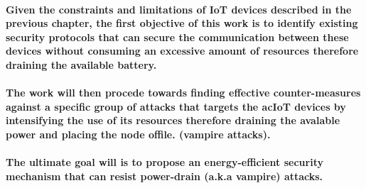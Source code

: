 \paragraph{
Given the constraints and limitations of \ac{IoT} devices described in the previous chapter, the first objective of this work is to identify existing security protocols that can secure the communication between these devices without consuming an excessive amount of resources therefore draining the available battery.
}
\paragraph{
The work will then procede towards finding effective counter-measures against a specific group of attacks that targets the ac{IoT} devices by intensifying the use of its resources therefore draining the avalable power and placing the node offile. (vampire attacks).
}
\paragraph{
The ultimate goal will is to propose an energy-efficient security mechanism that can resist power-drain (a.k.a vampire) attacks.
}